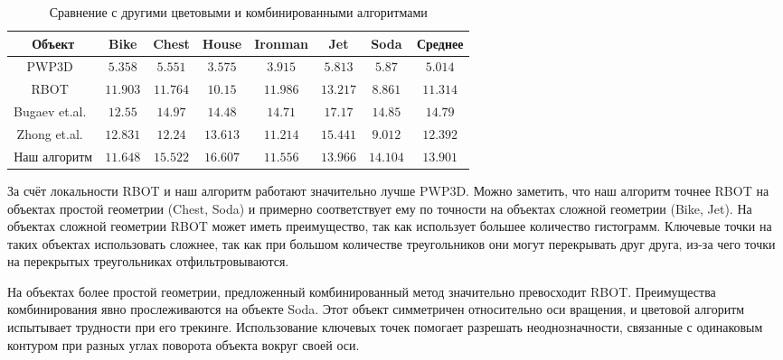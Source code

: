\begin{table}[h]
\caption{\label{tab:analogues}Сравнение с другими цветовыми и комбинированными
алгоритмами}
\begin{center}
\begin{tabular}{|c|c|c|c|c|c|c|c|}
\hline
Объект & Bike & Chest & House & Ironman & Jet & Soda & Среднее \\
\hline
PWP3D~\cite{PWP3D} & $5.358$ & $5.551$ & $3.575$ &
$3.915$ & $5.813$ & $5.87$ & $5.014$ \\
\hline
RBOT~\cite{Tjaden2018} & $11.903$ & $11.764$ & $10.15$ &
$11.986$ & $13.217$ & $8.861$ & $11.314$ \\
\hline
Bugaev et.al.~\cite{Bugaev_2018_ECCV} & $12.55$ & $14.97$ & $14.48$ &
$14.71$ & $17.17$ & $14.85$ & $14.79$ \\
\hline
Zhong et.al.~\cite{Zhong2020} & $12.831$ & $12.24$ & $13.613$ &
$11.214$ & $15.441$ & $9.012$ & $12.392$ \\
\hline
Наш алгоритм & $11.648$ & $15.522$ & $16.607$ & $11.556$ & $13.966$ & $14.104$
& $13.901$ \\
\hline
\end{tabular}
\end{center}
\end{table}

За счёт локальности RBOT и наш алгоритм работают значительно лучше PWP3D. 
Можно заметить, что наш алгоритм точнее RBOT на объектах простой геометрии
(Chest, Soda) и примерно соответствует ему по точности на объектах сложной
геометрии (Bike, Jet).
На объектах сложной геометрии RBOT может иметь преимущество, так как использует
большее количество гистограмм.
Ключевые точки на таких объектах использовать сложнее, так как при большом
количестве треугольников они могут перекрывать друг друга, из-за чего точки на
перекрытых треугольниках отфильтровываются.

На объектах более простой геометрии, предложенный комбинированный метод
значительно превосходит RBOT.
Преимущества комбинирования явно прослеживаются на объекте Soda. 
Этот объект симметричен относительно оси вращения, и цветовой алгоритм
испытывает трудности при его трекинге.
Использование ключевых точек помогает разрешать неоднозначности, связанные с
одинаковым контуром при разных углах поворота объекта вокруг своей оси.


